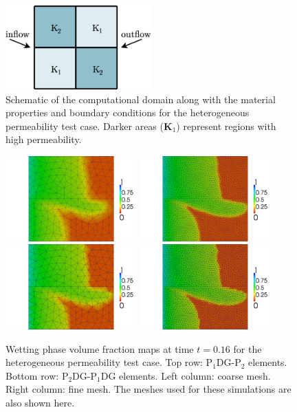 \documentclass[times]{fldauth}
\newcommand{\PN}[2][error]{P$_{#1}$DG-P$_{#2}$}
\begin{document}
\begin{figure}[h!]
  \begin{center}
    \includegraphics[width=0.5\textwidth]{4Rregion_BLv2}
    \caption{Schematic of the computational domain along with the
      material properties and boundary conditions for the
      heterogeneous permeability test case. Darker areas
      ($\mathbf{K}_\text{1}$) represent regions with high
      permeability. \label{fig:4reg_BL_schematic}}
  \end{center}
\end{figure}

\begin{figure}[h!]
  \centering
  \includegraphics[width=0.45\textwidth]{CG_coarse083.png}
  \includegraphics[width=0.45\textwidth]{CG_fine083.png}
  \includegraphics[width=0.45\textwidth]{DG_coarse083.png}
  \includegraphics[width=0.45\textwidth]{DG_fine083.png}
  \caption{Wetting phase volume fraction maps at time $t=0.16$ for the
    heterogeneous permeability test case. Top row: \PN[1]{2}
    elements. Bottom row: \PN[2]{1}DG elements. Left column: coarse
    mesh. Right column: fine mesh. The meshes used for these
    simulations are also shown here.\label{fig:4reg_maps}}
\end{figure}
\end{document}
